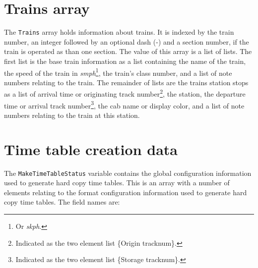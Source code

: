 \section{Trains array}

The {\tt Trains} array holds information about trains.  It is indexed
by the train number, an integer followed by an optional dash (-) and a
section number, if the train is operated as than one section.  The
value of this array is a list of lists.  The first list is the base
train information as a list containing the name of the train, the speed
of the train in {\em smph}\footnote{Or {\em skph}.}, the train's class
number, and a list of note numbers relating to the train.  The
remainder of lists are the trains station stops as a list of arrival
time or originating track number\footnote{Indicated as the two element
list \{Origin tracknum\}.}, the station, the departure time or arrival
track number\footnote{Indicated as the two element list \{Storage
tracknum\}.}, the cab name or display color, and a list of note numbers
relating to the train at this station.

\section{Time table creation data}

The {\tt MakeTimeTableStatus} variable contains the global
configuration information used to generate hard copy time tables.  This
is an array with a number of elements relating to the format
configuration information used to generate hard copy time tables.  The
field names are:


